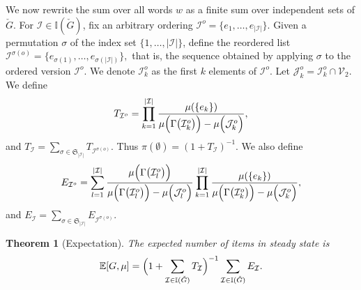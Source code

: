 \documentclass[11pt]{article}
\newtheorem{theorem}{Theorem}
\begin{document}
{We now rewrite the sum over all words $w$ as a finite sum over independent sets of $\check{G}$. 
For $\mathcal{I}\in\mathbb{I}(\check G)$,  fix an arbitrary ordering 
$\mathcal{I}^o=\{e_1,\dots,e_{|\mathcal{I}|}\}$. Given a permutation $\sigma$ 
of the index set $\{1,\dots,|\mathcal{I}|\}$, define the reordered 
list $\mathcal{I}^{\sigma(o)}=\{e_{\sigma(1)},\dots,e_{\sigma(|\mathcal{I}|)}\},$
that is, the sequence obtained by applying 
$\sigma$ to the ordered version $\mathcal{I}^o$. 
 We denote $\mathcal{I}_k^o$ as the first $k$ elements of $\mathcal{I}^o$.
Let $\mathcal{J}_k^o=\mathcal{I}_k^o\cap \mathcal{V}_2$. 
We define 
\begin{equation}
T_{\mathcal{I}^o}=\prod_{k=1}^{|\mathcal{I}|}\frac{\mu(\{e_{k}\})}{\mu\Bigl(\Gamma\bigl(\mathcal{I}_k^o\bigr)\Bigr)-\mu\Bigl(\mathcal{J}_k^o\Bigr)},
\end{equation}
and $T_{\mathcal{I}}=\sum_{\sigma \in \mathfrak{S}_{|\mathcal{I}|}} T_{\mathcal{I}^{\sigma(o)}}$. Thus $\pi(\emptyset) = (1 +T_{\mathcal{I}})^{-1}$. 
We also define
\begin{equation}
E_{\mathcal{I}^o}=\sum_{l=1}^{|\mathcal{I}|}
\frac{\mu\Bigl(\Gamma\bigl(\mathcal{I}_l^o\bigr)\Bigr)}
{\mu\Bigl(\Gamma\bigl(\mathcal{I}_l^o\bigr)\Bigr)-
\mu\Bigl(\mathcal{J}_l^o\Bigr)}\prod_{k=1}^{|\mathcal{I}|}
\frac{\mu(\{e_{k}\})}{\mu\Bigl(\Gamma\bigl(\mathcal{I}_k^o\bigr)\Bigr)-
\mu\Bigl(\mathcal{J}_k^o\Bigr)},   
\end{equation}
and $E_{\mathcal{I}}=\sum_{\sigma \in \mathfrak{S}_{|\mathcal{I}|}} E_{\mathcal{I}^{\sigma(o)}}$.

\begin{theorem}
[Expectation]\label{cor:exp-multi}
The expected number of items in steady state is
\begin{equation}\label{eq:exp-multi}
\mathbb{E}[G,\mu]=\Bigl(1+\sum_{\mathcal{I}\in\mathbb{I}(\check G)}T_\mathcal{I}\Bigr)^{-1}\sum_{\mathcal{I}\in\mathbb{I}(\check G)}E_\mathcal{I}.
\end{equation}
\end{theorem}

}
\end{document}
